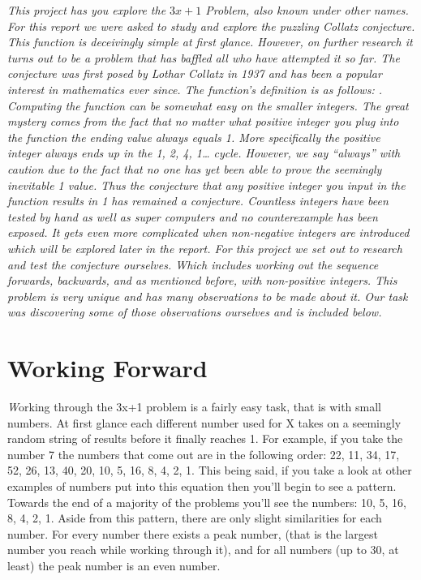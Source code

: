 \documentclass[10pt,english, openany]{book}
\begin{document}
\textit{This project has you explore the $3x + 1$ Problem, also known under other names.  For this report we were asked to study and explore the puzzling Collatz conjecture. This function is deceivingly simple at first glance. However, on further research it turns out to be a problem that has baffled all who have attempted it so far. The conjecture was first posed by Lothar Collatz in 1937 and has been a popular interest in mathematics ever since. The function’s definition is as follows:  . Computing the function can be somewhat easy on the smaller integers. The great mystery comes from the fact that no matter what positive integer you plug into the function the ending value always equals 1. More specifically the positive integer always ends up in the 1, 2, 4, 1… cycle. However, we say “always” with caution due to the fact that no one has yet been able to prove the seemingly inevitable 1 value. Thus the conjecture that any positive integer you input in the function results in 1 has remained a conjecture. Countless integers have been tested by hand as well as super computers and no counterexample has been exposed. It gets even more complicated when non-negative integers are introduced which will be explored later in the report. For this project we set out to research and test the conjecture ourselves. Which includes working out the sequence forwards, backwards, and as mentioned before, with non-positive integers. This problem is very unique and has many observations to be made about it. Our task was discovering some of those observations ourselves and is included below.}
\clearpage

\section{Working Forward}
\textit Working through the 3x+1 problem is a fairly easy task, that is with small numbers.
At first glance each different number used for X takes on a seemingly random string of
results before it finally reaches 1. For example, if you take the number 7 the numbers that
come out are in the following order: 22, 11, 34, 17, 52, 26, 13, 40, 20, 10, 5, 16, 8, 4, 2, 1.
This being said, if you take a look at other examples of numbers put into this equation then
you'll begin to see a pattern. Towards the end of a majority of the problems you'll see the
numbers: 10, 5, 16, 8, 4, 2, 1. Aside from this pattern, there are only slight similarities
for each number. For every number there exists a peak number, (that is the largest
number you reach while working through it), and for all numbers (up to 30, at least) the
peak number is an even number.
\end{document}
